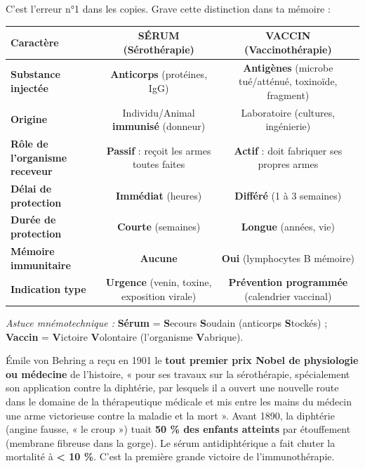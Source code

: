 \documentclass[11pt]{article}
\begin{document}
\begin{attention}
C'est l'erreur n°1 dans les copies. Grave cette distinction dans ta mémoire :
\begin{center}
\begin{tabular}{|l|c|c|}
\hline
\rowcolor{popblueL} \textbf{Caractère} & \textbf{SÉRUM (Sérothérapie)} & \textbf{VACCIN (Vaccinothérapie)} \\
\hline
\textbf{Substance injectée} & \textbf{Anticorps} (protéines, IgG) & \textbf{Antigènes} (microbe tué/atténué, toxinoïde, fragment) \\
\hline
\textbf{Origine} & Individu/Animal \textbf{immunisé} (donneur) & Laboratoire (cultures, ingénierie) \\
\hline
\textbf{Rôle de l'organisme receveur} & \textbf{Passif} : reçoit les armes toutes faites & \textbf{Actif} : doit fabriquer ses propres armes \\
\hline
\textbf{Délai de protection} & \textbf{Immédiat} (heures) & \textbf{Différé} (1 à 3 semaines) \\
\hline
\textbf{Durée de protection} & \textbf{Courte} (semaines) & \textbf{Longue} (années, vie) \\
\hline
\textbf{Mémoire immunitaire} & \textbf{Aucune} & \textbf{Oui} (lymphocytes B mémoire) \\
\hline
\textbf{Indication type} & \textbf{Urgence} (venin, toxine, exposition virale) & \textbf{Prévention programmée} (calendrier vaccinal) \\
\hline
\end{tabular}
\end{center}
\emph{Astuce mnémotechnique :} \textbf{Sérum} = \textbf{S}ecours \textbf{S}oudain (anticorps \textbf{S}tockés) ; \textbf{Vaccin} = \textbf{V}ictoire \textbf{V}olontaire (l'organisme \textbf{V}abrique).
\end{attention}

\begin{savaistu}
Émile von Behring a reçu en 1901 le \textbf{tout premier prix Nobel de physiologie ou médecine} de l'histoire, « pour ses travaux sur la sérothérapie, spécialement son application contre la diphtérie, par lesquels il a ouvert une nouvelle route dans le domaine de la thérapeutique médicale et mis entre les mains du médecin une arme victorieuse contre la maladie et la mort ». Avant 1890, la diphtérie (angine fausse, « le croup ») tuait \textbf{50 \% des enfants atteints} par étouffement (membrane fibreuse dans la gorge). Le sérum antidiphtérique a fait chuter la mortalité à \textbf{< 10 \%}. C'est la première grande victoire de l'immunothérapie.
\end{savaistu}
\end{document}
